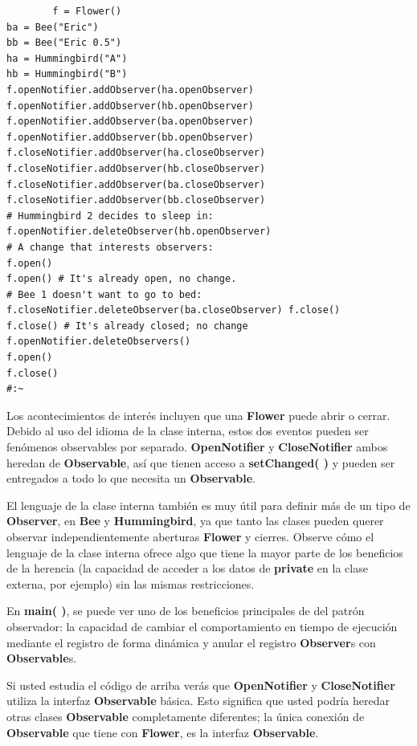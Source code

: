 \documentclass{article}
\begin{document}
\begin{lstlisting}
        f = Flower() 
ba = Bee("Eric") 
bb = Bee("Eric 0.5") 
ha = Hummingbird("A") 
hb = Hummingbird("B") 
f.openNotifier.addObserver(ha.openObserver) 
f.openNotifier.addObserver(hb.openObserver) 
f.openNotifier.addObserver(ba.openObserver) 
f.openNotifier.addObserver(bb.openObserver) 
f.closeNotifier.addObserver(ha.closeObserver) 
f.closeNotifier.addObserver(hb.closeObserver) 
f.closeNotifier.addObserver(ba.closeObserver) 
f.closeNotifier.addObserver(bb.closeObserver) 
# Hummingbird 2 decides to sleep in: 
f.openNotifier.deleteObserver(hb.openObserver) 
# A change that interests observers: 
f.open() 
f.open() # It's already open, no change. 
# Bee 1 doesn't want to go to bed: 
f.closeNotifier.deleteObserver(ba.closeObserver) f.close() 
f.close() # It's already closed; no change 
f.openNotifier.deleteObservers() 
f.open() 
f.close() 
#:~ 
\end{lstlisting}

Los acontecimientos de interés incluyen que una \textbf{Flower} puede abrir o cerrar. Debido al uso del idioma de la clase interna, estos dos eventos pueden ser fenómenos observables por separado. \textbf{OpenNotifier} y \textbf{CloseNotifier} ambos heredan de \textbf{Observable}, así que tienen acceso a \textbf{setChanged( )} y pueden ser entregados a todo lo que necesita un \textbf{Observable}. \newline

El lenguaje de la clase interna también es muy útil para definir más de un tipo de \textbf{Observer}, en \textbf{Bee} y \textbf{Hummingbird}, ya que tanto las clases pueden querer observar independientemente aberturas \textbf{Flower} y cierres. Observe cómo el lenguaje de la clase interna ofrece algo que tiene la mayor parte de los beneficios de la herencia (la capacidad de acceder a los datos de \textbf{private} en la clase externa, por ejemplo) sin las mismas restricciones.  \newline

En \textbf{main( )}, se puede ver uno de los beneficios principales de del patrón observador: la capacidad de cambiar el comportamiento en tiempo de ejecución mediante el registro de forma dinámica y anular el registro \textbf{Observer}s con \textbf{Observable}s.    \newline

Si usted estudia el código de arriba verás que \textbf{OpenNotifier} y \textbf{CloseNotifier} utiliza la interfaz \textbf{Observable} básica. Esto significa que usted podría heredar otras clases \textbf{Observable} completamente diferentes; la única conexión de \textbf{Observable} que tiene con \textbf{Flower}, es la interfaz \textbf{Observable}.    \newline
\end{document}
